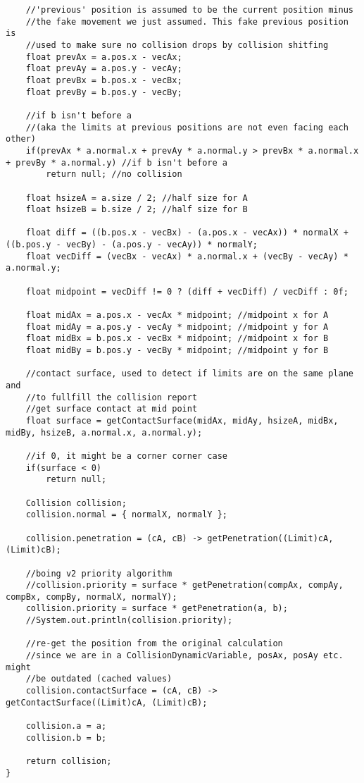 \documentclass[12pt]{article}
\begin{document}
\begin{lstlisting}
	//'previous' position is assumed to be the current position minus
	//the fake movement we just assumed. This fake previous position is
	//used to make sure no collision drops by collision shitfing
	float prevAx = a.pos.x - vecAx;
	float prevAy = a.pos.y - vecAy;
	float prevBx = b.pos.x - vecBx;
	float prevBy = b.pos.y - vecBy;

	//if b isn't before a
	//(aka the limits at previous positions are not even facing each other)
	if(prevAx * a.normal.x + prevAy * a.normal.y > prevBx * a.normal.x + prevBy * a.normal.y) //if b isn't before a
		return null; //no collision

	float hsizeA = a.size / 2; //half size for A
	float hsizeB = b.size / 2; //half size for B

	float diff = ((b.pos.x - vecBx) - (a.pos.x - vecAx)) * normalX + ((b.pos.y - vecBy) - (a.pos.y - vecAy)) * normalY;
	float vecDiff = (vecBx - vecAx) * a.normal.x + (vecBy - vecAy) * a.normal.y;

	float midpoint = vecDiff != 0 ? (diff + vecDiff) / vecDiff : 0f;

	float midAx = a.pos.x - vecAx * midpoint; //midpoint x for A
	float midAy = a.pos.y - vecAy * midpoint; //midpoint y for A
	float midBx = b.pos.x - vecBx * midpoint; //midpoint x for B
	float midBy = b.pos.y - vecBy * midpoint; //midpoint y for B

	//contact surface, used to detect if limits are on the same plane and
	//to fullfill the collision report
	//get surface contact at mid point
	float surface = getContactSurface(midAx, midAy, hsizeA, midBx, midBy, hsizeB, a.normal.x, a.normal.y);

	//if 0, it might be a corner corner case
	if(surface < 0)
		return null;

	Collision collision;
	collision.normal = { normalX, normalY };

	collision.penetration = (cA, cB) -> getPenetration((Limit)cA, (Limit)cB);

	//boing v2 priority algorithm
	//collision.priority = surface * getPenetration(compAx, compAy, compBx, compBy, normalX, normalY);
	collision.priority = surface * getPenetration(a, b);
	//System.out.println(collision.priority);

	//re-get the position from the original calculation
	//since we are in a CollisionDynamicVariable, posAx, posAy etc. might
	//be outdated (cached values)
	collision.contactSurface = (cA, cB) -> getContactSurface((Limit)cA, (Limit)cB);

	collision.a = a;
	collision.b = b;

	return collision;
}
\end{lstlisting}
\end{document}
